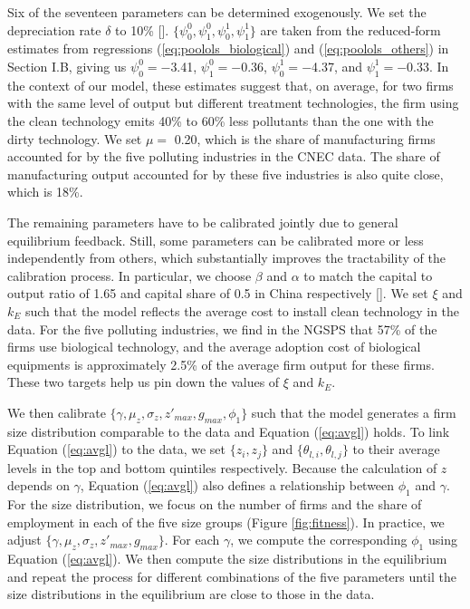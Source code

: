 \documentclass[AEJ]{AEA}
\begin{document}
Six of the seventeen parameters can be determined exogenously. We set the depreciation rate $\delta$ to 10\% [\citet{Songetal:2011}]. $\{\psi_0^{0}, \psi_1^{0}, \psi_0^{1}, \psi_1^{1} \}$ are taken from the reduced-form estimates from regressions (\ref{eq:poolols_biological}) and (\ref{eq:poolols_others}) in Section I.B, giving us $\psi_0^{0} = -$3.41, $\psi_1^{0} = -$0.36, $\psi_0^{1} = -$4.37, and  $\psi_1^{1} = -$0.33. In the context of our model, these estimates suggest that, on average, for two firms with the same level of output but different treatment technologies, the firm using the clean technology emits 40\% to 60\% less pollutants than the one with the dirty technology. We set $\mu =$ 0.20, which is the share of manufacturing firms accounted for by the five polluting industries in the CNEC data. The share of manufacturing output accounted for by these five industries is also quite close, which is 18\%.

The remaining parameters have to be calibrated jointly due to general equilibrium feedback. Still, some parameters can be calibrated more or less independently from others, which substantially improves the tractability of the calibration process. In particular, we choose $\beta$ and $\alpha$ to match the capital to output ratio of 1.65 and capital share of 0.5 in China respectively [\citet{Baietal:2006}]. We set $\xi$ and $k_E$ such that the model reflects the average cost to install clean technology in the data. For the five polluting industries, we find in the NGSPS that 57\% of the firms use biological technology, and the average adoption cost of biological equipments is approximately 2.5\% of the average firm output for these firms. These two targets help us pin down the values of $\xi$ and $k_E$.

We then calibrate $\{\gamma, \mu_z, \sigma_z, z'_{max}, g_{max}, \phi_1 \}$ such that the model generates a firm size distribution comparable to the data and Equation (\ref{eq:avgl}) holds. To link Equation (\ref{eq:avgl}) to the data, we set $\{z_i, z_j\}$ and $\{\theta_{l,i}, \theta_{l,j}\}$ to their average levels in the top and bottom quintiles respectively. Because the calculation of $z$ depends on $\gamma$, Equation (\ref{eq:avgl}) also defines a relationship between $\phi_1$ and $\gamma$. For the size distribution, we focus on the number of firms and the share of employment in each of the five size groups (Figure \ref{fig:fitness}). In practice, we adjust $\{\gamma, \mu_z, \sigma_z, z'_{max}, g_{max} \}$. For each $\gamma$, we compute the corresponding $\phi_1$ using Equation (\ref{eq:avgl}). We then compute the size distributions in the equilibrium and repeat the process for different combinations of the five parameters until the size distributions in the equilibrium are close to those in the data.
\end{document}
